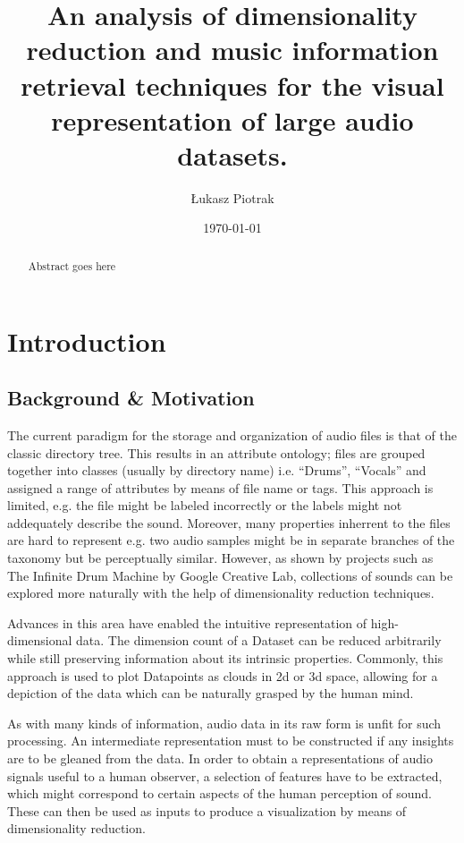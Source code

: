 \documentclass[11pt]{article}
\author{Łukasz Piotrak}
\date{\today}
\title{An analysis of dimensionality reduction and music information retrieval techniques for the visual representation of large audio datasets.}
\begin{document}
\maketitle
\tableofcontents

\begin{abstract}
Abstract goes here
\end{abstract}

\section{Introduction}
\label{sec:org1511426}
\subsection{Background \& Motivation}
\label{sec:org6e5ed69}
The current paradigm for the storage and organization of audio files is that of the classic directory tree. This results in an attribute ontology; files are grouped together into classes (usually by directory name) i.e. ``Drums'', ``Vocals'' and assigned a range of attributes by means of file name or tags. This approach is limited, e.g. the file might be labeled incorrectly or the labels might not addequately describe the sound. Moreover, many properties inherrent to the files are hard to represent e.g. two audio samples might be in separate branches of the taxonomy but be perceptually similar. However, as shown by projects such as The Infinite Drum Machine by Google Creative Lab, collections of sounds can be explored more naturally with the help of dimensionality reduction techniques.

Advances in this area have enabled the intuitive representation of high-dimensional data. The dimension count of a Dataset can be reduced arbitrarily while still preserving information about its intrinsic properties. Commonly, this approach is used to plot Datapoints as clouds in 2d or 3d space, allowing for a depiction of the data which can be naturally grasped by the human mind.

As with many kinds of information, audio data in its raw form is unfit for such processing. An intermediate representation must to be constructed if any insights are to be gleaned from the data. In order to obtain a representations of audio signals useful to a human observer, a selection of features have to be extracted, which might correspond to certain aspects of the human perception of sound. These can then be used as inputs to produce a visualization by means of dimensionality reduction.
\end{document}
